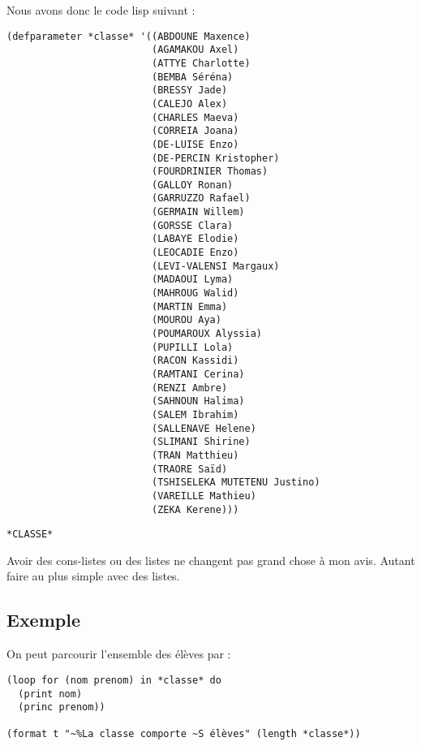 \documentclass[a4paper, 11pt, DIV=18]{scrartcl}
\begin{document}
Nous avons donc le code lisp suivant :
\begin{verbatim}
(defparameter *classe* '((ABDOUNE Maxence)
                         (AGAMAKOU Axel)
                         (ATTYE Charlotte)
                         (BEMBA Séréna)
                         (BRESSY Jade)
                         (CALEJO Alex)
                         (CHARLES Maeva)
                         (CORREIA Joana)
                         (DE-LUISE Enzo)
                         (DE-PERCIN Kristopher)
                         (FOURDRINIER Thomas)
                         (GALLOY Ronan)
                         (GARRUZZO Rafael)
                         (GERMAIN Willem)
                         (GORSSE Clara)
                         (LABAYE Elodie)
                         (LEOCADIE Enzo)
                         (LEVI-VALENSI Margaux)
                         (MADAOUI Lyma)
                         (MAHROUG Walid)
                         (MARTIN Emma)
                         (MOUROU Aya)
                         (POUMAROUX Alyssia)
                         (PUPILLI Lola)
                         (RACON Kassidi)
                         (RAMTANI Cerina)
                         (RENZI Ambre)
                         (SAHNOUN Halima)
                         (SALEM Ibrahim)
                         (SALLENAVE Helene)
                         (SLIMANI Shirine)
                         (TRAN Matthieu)
                         (TRAORE Saïd)
                         (TSHISELEKA MUTETENU Justino)
                         (VAREILLE Mathieu)
                         (ZEKA Kerene)))
\end{verbatim}

\begin{verbatim}
*CLASSE*
\end{verbatim}


Avoir des cons-listes ou des listes ne changent pas grand chose à mon avis.
Autant faire au plus simple avec des listes.

\subsection{Exemple}
\label{sec:orgf32f9e9}

On peut parcourir l'ensemble des élèves par :
\begin{verbatim}
(loop for (nom prenom) in *classe* do
  (print nom)
  (princ prenom))

(format t "~%La classe comporte ~S élèves" (length *classe*))
\end{verbatim}
\end{document}
